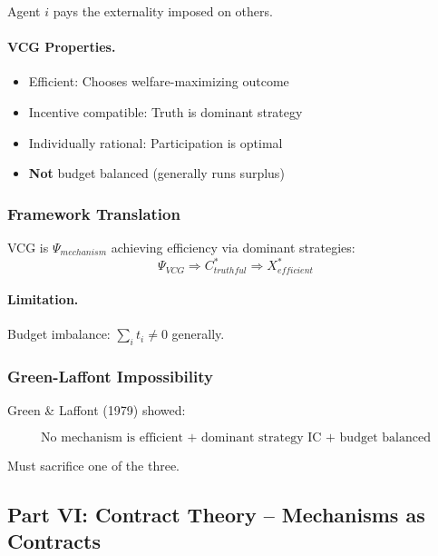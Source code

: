 Agent $i$ pays the externality imposed on others.

\paragraph{VCG Properties.}
\begin{itemize}
    \item Efficient: Chooses welfare-maximizing outcome
    \item Incentive compatible: Truth is dominant strategy
    \item Individually rational: Participation is optimal
    \item \textbf{Not} budget balanced (generally runs surplus)
\end{itemize}

\subsubsection{Framework Translation}

VCG is $\Psi_{mechanism}$ achieving efficiency via dominant strategies:
\begin{equation}
\Psi_{VCG} \Rightarrow C^*_{truthful} \Rightarrow X^*_{efficient}
\end{equation}

\paragraph{Limitation.}
Budget imbalance: $\sum_i t_i \neq 0$ generally.

\subsubsection{Green-Laffont Impossibility}

Green \& Laffont (1979) showed:

\begin{equation}
\boxed{
\text{No mechanism is efficient + dominant strategy IC + budget balanced}
}
\label{eq:green-laffont}
\end{equation}

Must sacrifice one of the three.

\subsection{Part VI: Contract Theory – Mechanisms as Contracts}

